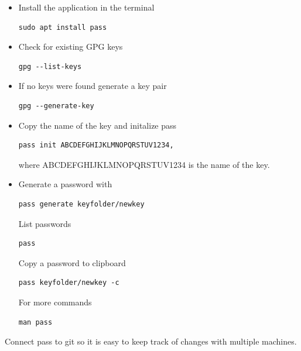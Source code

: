 \documentclass{article}
\begin{document}
\begin{itemize}
\item Install the application in the terminal \\
\begin{verbatim}
sudo apt install pass  
\end{verbatim}
\item Check for existing GPG keys \\
\label{1}
\begin{verbatim}
gpg --list-keys 
\end{verbatim}
\item If no keys were found generate a key pair \\
\begin{verbatim}
gpg --generate-key
\end{verbatim}
\item Copy the name of the key and initalize pass\\
\begin{verbatim}
pass init ABCDEFGHIJKLMNOPQRSTUV1234, 
\end{verbatim}
where ABCDEFGHIJKLMNOPQRSTUV1234 is the name of the key.
\item Generate a password with \\
\begin{verbatim}
pass generate keyfolder/newkey 
\end{verbatim}
List passwords
\begin{verbatim}
pass
\end{verbatim}
Copy a password to clipboard \\
\begin{verbatim}
pass keyfolder/newkey -c
\end{verbatim}
For more commands
\begin{verbatim}
man pass
\end{verbatim}
\end{itemize}

Connect pass to git so it is easy to keep track of changes with multiple machines.
\end{document}
